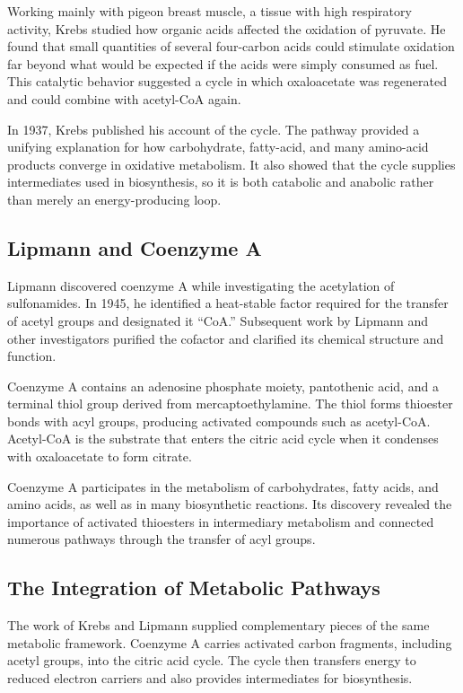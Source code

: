 Working mainly with pigeon breast muscle, a tissue with high respiratory activity, Krebs studied how organic acids affected the oxidation of pyruvate. He found that small quantities of several four-carbon acids could stimulate oxidation far beyond what would be expected if the acids were simply consumed as fuel. This catalytic behavior suggested a cycle in which oxaloacetate was regenerated and could combine with acetyl-CoA again.

In 1937, Krebs published his account of the cycle. The pathway provided a unifying explanation for how carbohydrate, fatty-acid, and many amino-acid products converge in oxidative metabolism. It also showed that the cycle supplies intermediates used in biosynthesis, so it is both catabolic and anabolic rather than merely an energy-producing loop.

\subsection{Lipmann and Coenzyme A}

Lipmann discovered coenzyme A while investigating the acetylation of sulfonamides. In 1945, he identified a heat-stable factor required for the transfer of acetyl groups and designated it ``CoA.'' Subsequent work by Lipmann and other investigators purified the cofactor and clarified its chemical structure and function.

Coenzyme A contains an adenosine phosphate moiety, pantothenic acid, and a terminal thiol group derived from mercaptoethylamine. The thiol forms thioester bonds with acyl groups, producing activated compounds such as acetyl-CoA. Acetyl-CoA is the substrate that enters the citric acid cycle when it condenses with oxaloacetate to form citrate.

Coenzyme A participates in the metabolism of carbohydrates, fatty acids, and amino acids, as well as in many biosynthetic reactions. Its discovery revealed the importance of activated thioesters in intermediary metabolism and connected numerous pathways through the transfer of acyl groups.

\subsection{The Integration of Metabolic Pathways}

The work of Krebs and Lipmann supplied complementary pieces of the same metabolic framework. Coenzyme A carries activated carbon fragments, including acetyl groups, into the citric acid cycle. The cycle then transfers energy to reduced electron carriers and also provides intermediates for biosynthesis.

